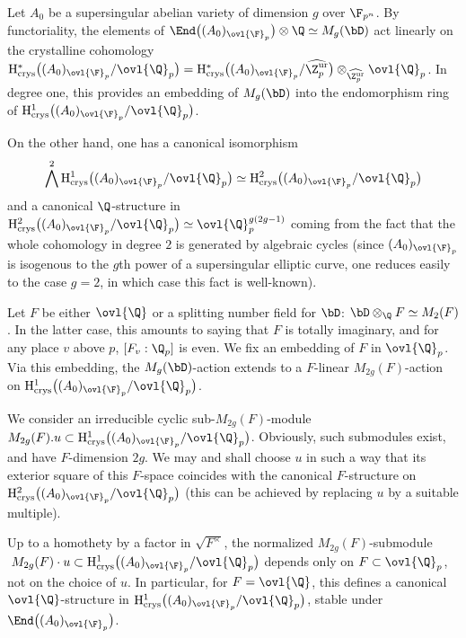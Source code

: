 \begin{para}\label{para-supersing}
 Let $A_0$ be a supersingular abelian variety of 
 dimension $g$ over $\F_{p^n}$. By functoriality, the elements of 
 $\End\bigl((A_0)_{\ovl{\F}_p}\bigr)\otimes \Q\simeq M_g(\bD)$ act
 linearly on the crystalline cohomology 
 ${\mathrm{H}^{\ast}_{\mathrm{crys}}\bigl((A_0)_{\ovl{\F}_p}/\ovl{\Q}_p\bigr)}=
 \mathrm{H}^{\ast}_{\mathrm{crys}}\bigl((A_0)_{\ovl{\F}_p}/
 \widehat{\Z_p^{\mathrm{ur}}}\bigr)\otimes_{\widehat{\Z_p^{\mathrm{ur}}}}
 \ovl{\Q}_p$. 
 In degree one, this provides an embedding of $M_g(\bD)$ into the
 endomorphism ring of 
 $\mathrm{H}^1_{\mathrm{crys}}\bigl((A_0)_{\ovl{\F}_p}/\ovl{\Q}_p\bigr)$.

 On the other hand, one has a canonical isomorphism
 \begin{equation*}
  \bigwedge^2
  \mathrm{H}^1_{\mathrm{crys}}\bigl((A_0)_{\ovl{\F}_p}/\ovl{\Q}_p\bigr) \simeq
  \mathrm{H}^2_{\mathrm{crys}}\bigl((A_0)_{\ovl{\F}_p}/\ovl{\Q}_p\bigr) 
 \end{equation*} 
 and a canonical $\Q$-structure in $
  \mathrm{H}^2_{\mathrm{crys}}\bigl((A_0)_{\ovl{\F}_p}/\ovl{\Q}_p\bigr)
  \simeq 
  \ovl{\Q}_p^{g(2g-1)}$ coming from the fact that the whole cohomology
 in degree $2$ is generated by algebraic cycles (since
 $(A_0)_{\ovl{\F}_p}$ is isogenous to the $g$th power of a
 supersingular elliptic curve, one reduces easily to the case $g=2$, in
 which case this fact is well-known).

\medskip Let $F$ be either $\ovl{\Q}$ or a splitting number field for $\bD$: 
 $\bD\otimes_{\Q} F\simeq
 M_2(F)$.  In the latter case, this amounts to saying that $F$ is 
 totally imaginary, and for any place $v$ above $p$,
 $[F_v:\Q_p]$ is even.  We fix an embedding of $F$ in $\ovl{\Q}_p$.  Via 
 this embedding, the $M_g(\bD)$-action extends to a
 $F$-linear $M_{2g}(F)$-action on
 $\mathrm{H}^1_{\mathrm{crys}}\bigl((A_0)_{\ovl{\F}_p}/\ovl{\Q}_p\bigr)$.

 \noindent We consider an irreducible cyclic sub-$M_{2g}(F)$-module 
 $M_{2g}(F).u\subset \mathrm{H}^1_{\mathrm{crys}}\bigl((A_0)_{\ovl{\F}_p}/\ovl{\Q}_p\bigr)$.
 Obviously, such submodules exist, and have $F$-dimension $2g$.  We may and shall choose $u$ in such a 
 way that its exterior square of this $F$-space coincides with the canonical $F$-structure on $
\mathrm{H}^2_{\mathrm{crys}}\bigl((A_0)_{\ovl{\F}_p}/\ovl{\Q}_p\bigr) $ (this can be achieved by replacing $u$ by a
 suitable multiple).

 \begin{pro}\label{betti-la} Up to a homothety by a factor in 
 $\sqrt{F^\times}$, the normalized
 $M_{2g}(F)$-submodule $\;M_{2g}(F)\cdot u\subset
 \mathrm{H}^1_{\mathrm{crys}}\bigl((A_0)_{\ovl{\F}_p}/\ovl{\Q}_p\bigr)$
 depends only on $F\subset \ovl{\Q}_p$, not on the choice
 of $u$. 
  In particular, for $F=\ovl{\Q}$, this defines a canonical $\ovl{\Q}$-structure in $
\mathrm{H}^1_{\mathrm{crys}}\bigl((A_0)_{\ovl{\F}_p}/\ovl{\Q}_p\bigr)$, stable under 
$\End\bigl((A_0)_{\ovl{\F}_p}\bigr)$.
\end{pro}
 

\end{para}
